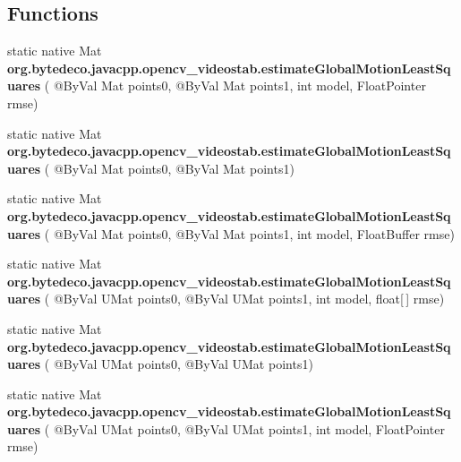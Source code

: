 \subsection*{Functions}
\begin{DoxyCompactItemize}
\item 
\mbox{\label{group__videostab__motion_ga8adc737314bed02188c54f89da25326c}} 
static native Mat {\bfseries org.\+bytedeco.\+javacpp.\+opencv\+\_\+videostab.\+estimate\+Global\+Motion\+Least\+Squares} ( @By\+Val Mat points0, @By\+Val Mat points1, int model, Float\+Pointer rmse)
\item 
\mbox{\label{group__videostab__motion_ga6261b26e98e11ed1ec1ae87c0ca6bf49}} 
static native Mat {\bfseries org.\+bytedeco.\+javacpp.\+opencv\+\_\+videostab.\+estimate\+Global\+Motion\+Least\+Squares} ( @By\+Val Mat points0, @By\+Val Mat points1)
\item 
\mbox{\label{group__videostab__motion_gaec0a13ba5d5eedfe1343cc90dffce0a6}} 
static native Mat {\bfseries org.\+bytedeco.\+javacpp.\+opencv\+\_\+videostab.\+estimate\+Global\+Motion\+Least\+Squares} ( @By\+Val Mat points0, @By\+Val Mat points1, int model, Float\+Buffer rmse)
\item 
\mbox{\label{group__videostab__motion_ga67c8ffb7092b2fd46f431a650d8db4a5}} 
static native Mat {\bfseries org.\+bytedeco.\+javacpp.\+opencv\+\_\+videostab.\+estimate\+Global\+Motion\+Least\+Squares} ( @By\+Val U\+Mat points0, @By\+Val U\+Mat points1, int model, float\mbox{[}$\,$\mbox{]} rmse)
\item 
\mbox{\label{group__videostab__motion_gaf51e5380ea4d36edb7bd80fc893406b4}} 
static native Mat {\bfseries org.\+bytedeco.\+javacpp.\+opencv\+\_\+videostab.\+estimate\+Global\+Motion\+Least\+Squares} ( @By\+Val U\+Mat points0, @By\+Val U\+Mat points1)
\item 
\mbox{\label{group__videostab__motion_gae8d09a5ec6cb01f05c492e9282288b65}} 
static native Mat {\bfseries org.\+bytedeco.\+javacpp.\+opencv\+\_\+videostab.\+estimate\+Global\+Motion\+Least\+Squares} ( @By\+Val U\+Mat points0, @By\+Val U\+Mat points1, int model, Float\+Pointer rmse)
\item 

\end{DoxyCompactItemize}
